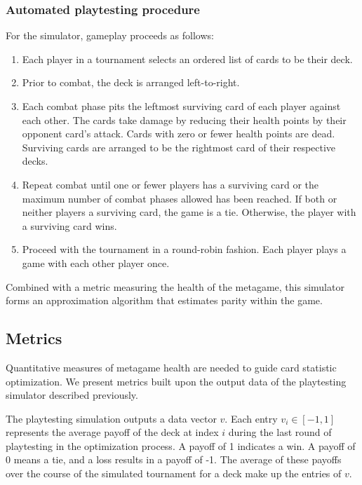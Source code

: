 \subsubsection{Automated playtesting procedure} \label{sec:tourney}

For the simulator, gameplay proceeds as follows:

\begin{enumerate}
	\item Each player in a tournament selects an ordered list
	of cards to be their deck.
	\item Prior to combat, the deck is arranged left-to-right.
	\item Each combat phase pits the leftmost surviving card
	of each player against each other. The cards take damage by 
	reducing their health points by their opponent card's attack.
	Cards with zero or fewer health points are dead. Surviving cards
	are arranged to be the rightmost card of their respective decks.
	\item Repeat combat until one or fewer players has a surviving card
	or the maximum number of combat phases allowed has been reached.
	If both or neither players a surviving card, the game is a tie.
	Otherwise, the player with a surviving card wins.
	\item Proceed with the tournament in a round-robin fashion. Each 
	player plays a game with each other player once.
\end{enumerate}

Combined with a metric measuring the health of the metagame, this simulator 
forms an approximation algorithm that estimates parity within the game.

\subsection{Metrics} \label{sec:metrics}

Quantitative measures of metagame health are needed to guide 
card statistic optimization. We present metrics built upon the
output data of the playtesting simulator described previously.

The playtesting simulation outputs a data vector $v$.
Each entry $v_i \in [-1, 1]$ represents the average payoff of
the deck at index $i$ during the last round of playtesting in
the optimization process. A payoff of 1 indicates a win. A
payoff of 0 means a tie, and a loss results in a payoff of -1.
The average of these payoffs over the course of the simulated
tournament for a deck make up the entries of $v$.

